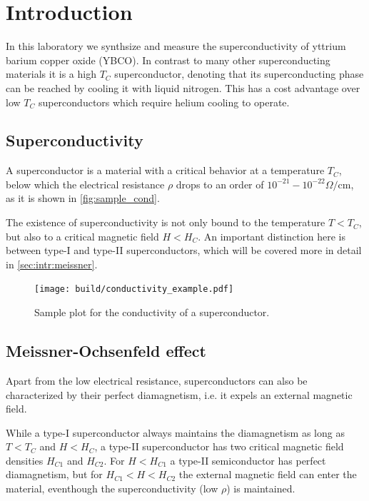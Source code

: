 \section{Introduction}
\label{sec:introduction}
In this laboratory we synthsize and measure the superconductivity of yttrium barium copper oxide
(YBCO). In contrast to many other superconducting materials it is a high $T_C$
superconductor, denoting that its superconducting phase can be reached by cooling it with liquid
nitrogen. This has a cost advantage over low $T_C$ superconductors which require helium cooling to
operate.

\subsection{Superconductivity}
\label{sec:Superconductivity}
A superconductor is a material with a critical behavior at a temperature $T_C$, below which the
electrical resistance $\rho$ drops to an order of $10^{-21} - 10^{-22} \Omega / \text{cm}$, as it is shown
in \autoref{fig:sample_cond}. 

The existence of superconductivity is not only bound to the temperature $T<T_C$, but also to a
critical magnetic field $H < H_C$. An important distinction here is between type-I and type-II
superconductors, which will be covered more in detail in \autoref{sec:intr:meissner}.

\begin{figure}
  \centering
  \texttt{[image: build/conductivity\_example.pdf]}
  \caption{Sample plot for the conductivity of a superconductor.}
  \label{fig:sample_cond}
\end{figure}

\subsection{Meissner-Ochsenfeld effect}
\label{sec:intr:meissner}
Apart from the low electrical resistance, superconductors can also be characterized by their perfect
diamagnetism, i.e. it expels an external magnetic field. 

While a type-I superconductor always maintains the diamagnetism as long as $T < T_C$ and $H < H_C$, a type-II
superconductor has two critical magnetic field densities $H_{C1}$ and $H_{C2}$. For $H < H_{C1}$ a
type-II semiconductor has perfect diamagnetism, but for $H_{C1} < H < H_{C2}$ the external magnetic
field can enter the material, eventhough the superconductivity (low $\rho$) is
maintained.

